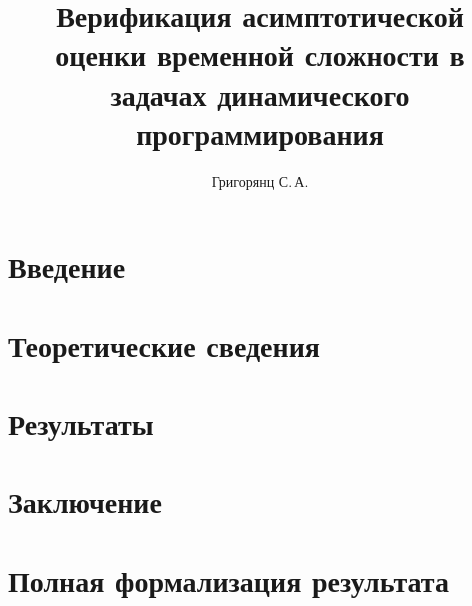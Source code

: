 \documentclass{mipt-thesis-bs}
\title{Верификация асимптотической оценки временной сложности в задачах динамического программирования}
\author{Григорянц С.\,А.}
\begin{document}
\newtheorem{lemma}{Лемма}[section]
\newtheorem{corollary}{Следствие}[section]
\newtheorem{proposition}{Утверждение}[section]
\newtheorem{remark}{Замечание}[section]
\newtheorem{fact}{Факт}[section]
\newtheorem{example}{Пример}[section]
\newtheorem{definition}{Определение}[section]

{\topsep}{\topsep}%
{\itshape}{}%
{\bfseries}{}%
{\newline}{}%
\theoremstyle{break}
\newtheorem{theorem}{Теорема}[section]


\frontmatter
\titlecontents

\mainmatter


\chapter{Введение}


\chapter{Теоретические сведения}


\chapter{Результаты}


\chapter{Заключение}


\chapter{Полная формализация результата}



\backmatter

\printbib


\end{document}
